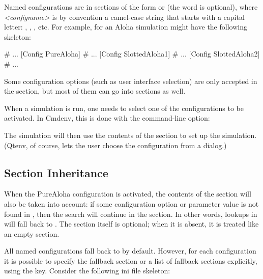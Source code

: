 Named configurations are in sections of the form  or
\ttt{[<configname>]} (the  word is optional), where \textit{<configname>}
is by convention a camel-case string that starts with a capital letter:
, , , etc. For example,
 for an Aloha simulation might have the following skeleton:

\begin{inifile}
[General]
# ...
[Config PureAloha]
# ...
[Config SlottedAloha1]
# ...
[Config SlottedAloha2]
# ...
\end{inifile}

Some configuration options (such as user interface selection) are only
accepted in the \ttt{[General]} section, but most of them can go into 
sections as well.

When a simulation is run, one needs to select one of the configurations
to be activated. In Cmdenv, this is done with the  command-line option:


The simulation will then use the contents of the 
section to set up the simulation. (Qtenv, of course, lets the user choose
the configuration from a dialog.)


\subsection{Section Inheritance}
\label{sec:config-sim:section-inheritance}

When the PureAloha configuration is activated, the contents of
the \ttt{[General]} section will also be taken into account: if some
configuration option or parameter value is not found in ,
then the search will continue in the \ttt{[General]} section. In
other words, lookups in  will fall back to \ttt{[General]}.
The \ttt{[General]} section itself is optional; when it is absent, it is
treated like an empty \ttt{[General]} section.

All named configurations fall back to \ttt{[General]} by default. However, for
each configuration it is possible to specify the fallback section or a list of
fallback sections explicitly, using the  key. Consider the
following ini file skeleton:

